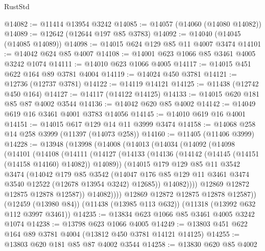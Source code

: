 \begin{lexlean}{RustStd}
\begin{coremodule}
@14082 := @11414 @13954 @3242
@14085 := @14057 (@14060 (@14080 @14082))
@14089 := @12642 (@12644 @197 @85 @3783)
@14092 := @14040 (@14045 (@14085 @14089))
@14098 := @14015 @624 @129 @85 @11 @4007 @3474
@14101 := @14042 @624 @85 @4007
@14108 := @14001 @623 @1066 @85 @3461 @4005 @3242 @1074
@14111 := @14010 @623 @1066 @4005
@14117 := @14015 @451 @622 @164 @89 @3781 @4004
@14119 := @14024 @450 @3781
@14121 := @12736 (@12737 @3781)
@14122 := @14119 @14121
@14125 := @11438 (@12742 @450 @164)
@14127 := @14117 (@14122 @14125)
@14133 := @14015 @620 @181 @85 @87 @4002 @3544
@14136 := @14042 @620 @85 @4002
@14142 := @14049 @619 @16 @3461 @4001 @3783 @14056
@14145 := @14010 @619 @16 @4001
@14151 := @14015 @617 @129 @14 @11 @3999 @3474
@14158 := @14068 @258 @14 @258 @3999 (@11397 (@14073 @258))
@14160 := @11405 (@11406 @3999)
@14228 := @13948
    (@13998
      (@14008
        (@14013
          (@14034
            (@14092
              (@14098
                (@14101
                  (@14108
                    (@14111
                      (@14127
                        (@14133
                          (@14136 (@14142 (@14145 (@14151 (@14158 @14160) @14082)) @14089))
                          (@14015
                            @179
                            @129
                            @85
                            @11
                            @3542
                            @3474
                            (@14042
                              @179
                              @85
                              @3542
                              (@14047
                                @176
                                @85
                                @129
                                @11
                                @3461
                                @3474
                                @3540
                                @12522
                                (@12678 @13954 @3242)
                                @12685))
                            @14082))))
                    @12869
                    @12872
                    @12875
                    @12878
                    @12587))
                @14082))))
        @12869
        @12872
        @12875
        @12878
        @12587))
    (@12459 (@13980 @84))
    (@11438 (@13985 @113 @632))
    (@11318 (@13992 @632 @112 @3997 @3461))
@14235 := @13834 @623 @1066 @85 @3461 @4005 @3242 @1074
@14238 := @13798 @623 @1066 @4005
@14249 := @13803 @451 @622 @164 @89 @3781 @4004 (@13812 @450 @3781 @14121 @14125)
@14255 := @13803 @620 @181 @85 @87 @4002 @3544
@14258 := @13830 @620 @85 @4002

\end{coremodule}
\end{lexlean}
